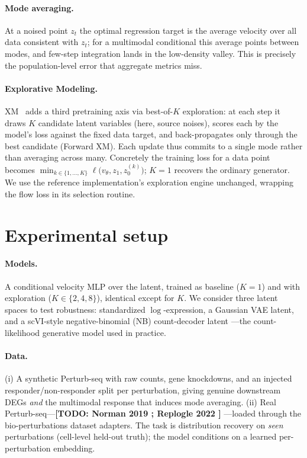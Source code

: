 \documentclass{article}
\newcommand{\TODO}[1]{{\color{red}\textbf{[TODO: #1]}}}
\begin{document}
\paragraph{Mode averaging.}
At a noised point $z_t$ the optimal regression target is the average velocity
over all data consistent with $z_t$; for a multimodal conditional this average
points between modes, and few-step integration lands in the low-density valley.
This is precisely the population-level error that aggregate metrics miss.

\paragraph{Explorative Modeling.}
XM~\citep{xm} adds a third pretraining axis via best-of-$K$ exploration: at each
step it draws $K$ candidate latent variables (here, source noises), scores each
by the model's loss against the fixed data target, and back-propagates only
through the best candidate (Forward XM). Each update thus commits to a single
mode rather than averaging across many. Concretely the training loss for a data
point becomes $\min_{k\in\{1,\dots,K\}} \ell\big(v_\theta, z_1, z_0^{(k)}\big)$;
$K{=}1$ recovers the ordinary generator. We use the reference implementation's
exploration engine unchanged, wrapping the flow loss in its selection routine.

\section{Experimental setup}
\label{sec:setup}

\paragraph{Models.}
A conditional velocity MLP over the latent, trained as baseline ($K{=}1$) and
with exploration ($K\in\{2,4,8\}$), identical except for $K$. We consider three
latent spaces to test robustness: standardized $\log$-expression, a Gaussian VAE
latent, and a scVI-style negative-binomial (NB) count-decoder latent
\citep{scvi}---the count-likelihood generative model used in practice.

\paragraph{Data.}
(i) A synthetic Perturb-seq with raw counts, gene knockdowns, and an injected
responder/non-responder split per perturbation, giving genuine downstream DEGs
\emph{and} the multimodal response that induces mode averaging. (ii) Real
Perturb-seq---\TODO{Norman 2019 \citep{norman}; Replogle 2022 \citep{replogle}}
---loaded through the bio-perturbations dataset adapters. The task is
distribution recovery on \emph{seen} perturbations (cell-level held-out truth);
the model conditions on a learned per-perturbation embedding.
\end{document}
